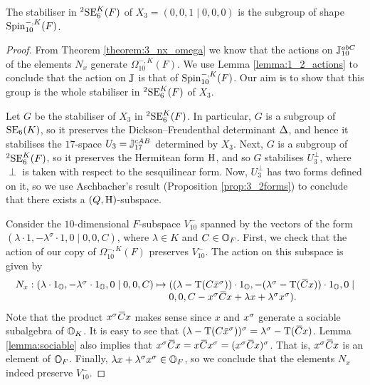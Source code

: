 \begin{theorem}
	The stabiliser in ${}^2\mathrm{SE}_6^K(F)$ of $X_3 = (0,0,1\mid 0,0,0)$ 
	is the subgroup of shape $\mathrm{Spin}_{10}^{-,K}(F)$. 
\end{theorem}

\begin{proof}
	From Theorem \ref{theorem:3_nx_omega} we know that the actions on $\mathbb{J}_{10}^{abC}$
	of the elements $N_x$ generate $\Omega_{10}^{-,K}(F)$. We use 
	Lemma \ref{lemma:1_2_actions} to conclude that the action on $\mathbb{J}$ is that of
	$\mathrm{Spin}_{10}^{-,K}(F)$. Our aim is to show that this group is the whole stabiliser
	in ${}^2\mathrm{SE}_6^K(F)$ of $X_3$.
	
	Let $G$ be the stabiliser of $X_3$ in ${}^2\mathrm{SE}_6^K(F)$. In particular, $G$ is 
	a subgroup of $\mathrm{SE}_6(K)$, so it preserves the Dickson--Freudenthal determinant
	$\Delta$, and hence it stabilises the $17$-space $U_3 = \mathbb{J}_{17}^{cAB}$ 
	determined by $X_3$. Next, $G$
	is a subgroup of ${}^2\mathrm{SE}_6^K(F)$, so it preserves the Hermitean form $\mathrm{H}$,
	and so $G$ stabilises $U_3^{\perp}$, where $\perp$ is taken with respect to the
	sesquilinear form. 
	Now, $U_3^{\perp}$ has two forms defined on it, so we use Aschbacher's result 
	(Proposition \ref{prop:3_2forms}) to conclude that there exists a $(Q, \mathrm{H})$-subspace.	
	
	Consider the $10$-dimensional $F$-subspace $V_{10}^-$ spanned by the vectors 
	of the form $(\lambda\cdot 1, -\lambda^{\sigma}\cdot 1, 
	0 \mid 0,0,C)$, where $\lambda \in K$ and 
	$C \in \mathbb{O}_F$. First, we check that the action of our copy of $\Omega_{10}^{-,K}(F)$ 
	preserves $V_{10}^-$. The action on this subspace is given by
	\begin{equation*}
		\begin{array}{r@{\;}c@{\;}l}
			N_x: (\lambda\cdot 1_{\O}, -\lambda^{\sigma} \cdot 1_{\O}, 0 \mid 0,0, C) & \mapsto & 
				((\lambda - \Tr(C \ovx^{\s}))\cdot 1_{\O}, 
				-(\lambda^{\sigma} -\Tr(\ovC x))\cdot 1_{\O}, 
				0 \mid \\
		& &					0,0, C - x^{\s} \ovC x + \lambda x + \lambda^{\sigma} x^{\s}).
		\end{array}
	\end{equation*}
	Note that the product $x^{\sigma} \mathord{\mbox{\hspace*{0pt}}\,\overline{\!C\!\!\;}\!\:}\mbox{\hspace*{0pt}} x$ makes sense since $x$ and $x^{\sigma}$ generate a
	sociable subalgebra of $\mathbb{O}_K$. It is easy to see that 
	$(\lambda - \Tr(C\ovx^{\s}))^{\sigma} = 
	\lambda^{\sigma} - \Tr(\ovC x)$. Lemma \ref{lemma:sociable} also implies that 
	$x^{\s} \ovC x = x \ovC x^{\s} = (x^{\s} \ovC x)^{\s}$. That is, $x^{\sigma} \mathord{\mbox{\hspace*{0pt}}\,\overline{\!C\!\!\;}\!\:}\mbox{\hspace*{0pt}} x$ is an 
    element of $\mathbb{O}_F$. Finally, $\lambda x +  \lambda^{\sigma} x^{\sigma} \in \mathbb{O}_F$, 
    so we conclude that 
    the elements $N_x$ indeed preserve $V_{10}^{-}$.
    

\end{proof}
